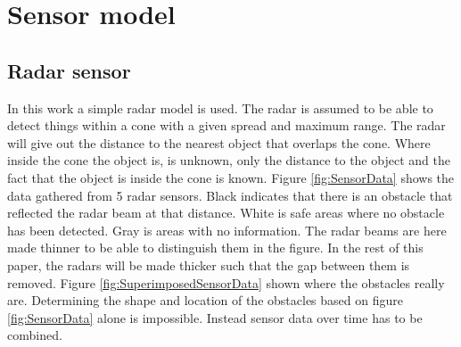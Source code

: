 \section{Sensor model}
\subsection{Radar sensor}
In this work a simple radar model is used. The radar is assumed to be able to detect things within a cone with a given spread and maximum range. The radar will give out the distance to the nearest object that overlaps the cone. Where inside the cone the object is, is unknown, only the distance to the object and the fact that the object is inside the cone is known. Figure \ref{fig:SensorData} shows the data gathered from 5 radar sensors. Black indicates that there is an obstacle that reflected the radar beam at that distance. White is safe areas where no obstacle has been detected. Gray is areas with no information. The radar beams are here made thinner to be able to distinguish them in the figure. In the rest of this paper, the radars will be made thicker such that the gap between them is removed. Figure \ref{fig:SuperimposedSensorData} shown where the obstacles really are. Determining the shape and location of the obstacles based on figure \ref{fig:SensorData} alone is impossible. Instead sensor data over time has to be combined.

